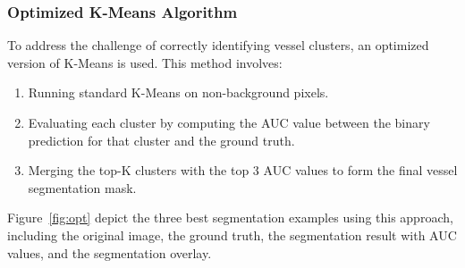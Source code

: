 \documentclass[12pt,letterpaper]{article}
\begin{document}
\subsubsection{Optimized K-Means Algorithm}
To address the challenge of correctly identifying vessel clusters, an optimized version of K-Means is used. This method involves:
\begin{enumerate}
    \item Running standard K-Means on non-background pixels.
    \item Evaluating each cluster by computing the AUC value between the binary prediction for that cluster and the ground truth.
    \item Merging the top-K clusters with the top 3 AUC values to form the final vessel segmentation mask.
\end{enumerate}
Figure~\ref{fig:opt} depict the three best segmentation examples using this approach, including the original image, the ground truth, the segmentation result with AUC values, and the segmentation overlay. 
\end{document}
